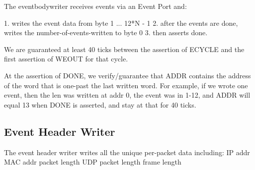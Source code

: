 The eventbodywriter receives events via an Event Port and: 

1. writes the event data from byte 1 ... 12*N - 1
2. after the events are done, writes the number-of-events-written to byte 0
3. then asserts done. 

We are guaranteed at least 40 ticks between the assertion of ECYCLE
and the first assertion of WEOUT for that cycle. 


At the assertion of DONE, we verify/guarantee that ADDR contains the address of the word that is one-past the last written word. For example, if we wrote one event, then the len was written at addr 0, the event was in 1-12, and ADDR will equal 13 when DONE is asserted, and stay at that for 40 ticks. 

\subsection{Event Header Writer}
The event header writer writes all the unique per-packet data including: 
IP addr
MAC addr
packet length
UDP packet length
frame length
